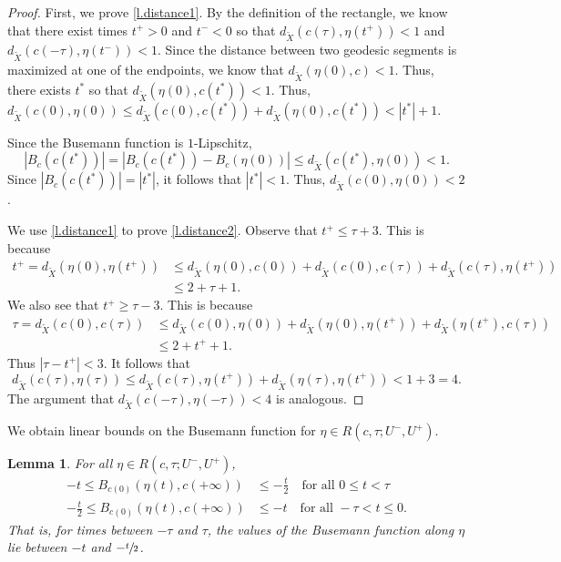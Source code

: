 \documentclass[10pt]{amsart}
\newtheorem{lem}[thm]{Lemma}
\theoremstyle{definition}
\numberwithin{equation}{section}
\begin{document}
\begin{proof}

First, we prove \eqref{l.distance1}. By the definition of the rectangle, we know that there exist times $t^+>0$ and $t^-<0$ so that $d_{\tilde X}(c(\tau), \eta(t^+))<1$ and $d_{\tilde X}(c(-\tau), \eta(t^-))<1$. Since the distance between two geodesic segments is maximized at one of the endpoints, we know that $d_{\tilde X}(\eta(0), c)<1$. Thus, there exists $t^\ast$ so that $d_{\tilde X}(\eta(0), c(t^\ast))<1$. Thus, $d_{\tilde X}(c(0), \eta(0)) \leq d_{\tilde X}(c(0), c(t^\ast))+ d_{\tilde X}(\eta(0), c(t^\ast)) < |t^\ast|+1$.

Since the Busemann function is $1$-Lipschitz,
\[|B_c(c(t^\ast))| = |B_c(c(t^\ast))- B_c(\eta(0))| \leq d_{\tilde X}(c(t^\ast), \eta(0)) <1.\]
Since $|B_c(c(t^\ast))| = |t^\ast|$, it follows that $|t^\ast|<1$. Thus, $d_{\tilde X}(c(0), \eta(0))<2$.

We use \eqref{l.distance1} to prove \eqref{l.distance2}. Observe that $t^+\leq \tau+3$. This is because
\begin{align*}
t^+=d_{\tilde X}(\eta(0), \eta(t^+)) &\leq d_{\tilde X}(\eta(0), c(0))+ d_{\tilde X}(c(0), c(\tau)) + d_{\tilde X}(c(\tau), \eta(t^+)) \\
& \leq 2+\tau +1.
\end{align*}
We also see that $t^+\geq \tau-3$. This is because
\begin{align*}
\tau = d_{\tilde X}(c(0), c(\tau)) & \leq d_{\tilde X}(c(0), \eta(0))+d_{\tilde X}(\eta(0), \eta(t^+))+d_{\tilde X}(\eta(t^+), c(\tau)) \\
& \leq 2 + t^+ +1.
\end{align*}
Thus $|\tau-t^+| <3$. It follows that
\[d_{\tilde X}(c(\tau), \eta(\tau)) \leq d_{\tilde X}(c (\tau), \eta(t^+))+ d_{\tilde X}(\eta(\tau), \eta(t^+))< 1+ 3 = 4.\]
The argument that $d_{\tilde X}(c(-\tau), \eta(-\tau))<4$ is analogous.
\end{proof}

We obtain linear bounds on the Busemann function for $\eta \in R(c, \tau; U^-,U^+)$.

\begin{lem}\label{lem:linear}
For all $\eta \in R(c, \tau; U^-, U^+)$,
\begin{align*}
-t \leq B_{c(0)}(\eta(t),c(+\infty)) &\leq - \frac{t}{2} \quad\mbox{for all } 0\leq t<\tau\\
\tag*{and}
-\frac{t}{2} \leq B_{c(0)}(\eta(t),c(+\infty)) &\leq - t \quad\mbox{for all } -\tau < t \leq 0.
\end{align*}
That is, for times between $-\tau$ and $\tau$, the values of the Busemann function along $\eta$ lie between $-t$ and $-\sfrac{t}{2}$.
\end{lem}
\end{document}
